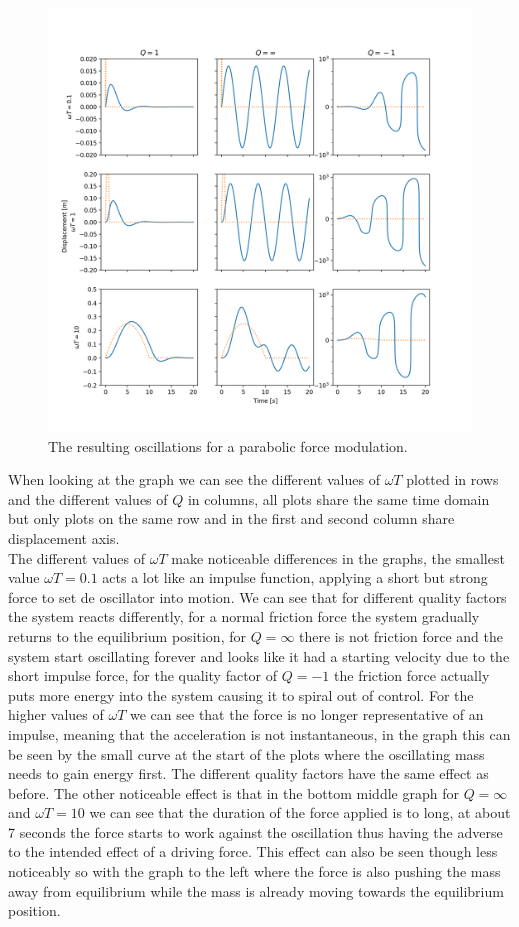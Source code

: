 \begin{figure}[h!]
    \centering
    \includegraphics[width=.7\linewidth,keepaspectratio]{figures/Q3_omega_q_plot.png}
    \caption{The resulting oscillations for a parabolic force modulation. }
    \label{fig:fig_Q3}
\end{figure}

When looking at the graph we can see the different values of $\omega T$ plotted in rows and the different values of $Q$ in columns, all plots share the same time domain but only plots on the same row and in the first and second column share displacement axis.\\
The different values of $\omega T$ make noticeable differences in the graphs, the smallest value $\omega T = 0.1$ acts a lot like an impulse function, applying a short but strong force to set de oscillator into motion. We can see that for different quality factors the system reacts differently, for a normal friction force the system gradually returns to the equilibrium position, for $Q = \infty$ there is not friction force and the system start oscillating forever and looks like it had a starting velocity due to the short impulse force, for the quality factor of $Q = -1$ the friction force actually puts more energy into the system causing it to spiral out of control.
For the higher values of $\omega T$ we can see that the force is no longer representative of an impulse, meaning that the acceleration is not instantaneous, in the graph this can be seen by the small curve at the start of the plots where the oscillating mass needs to gain energy first. The different quality factors have the same effect as before.
The other noticeable effect is that in the bottom middle graph for $Q=\infty$ and $\omega T = 10$ we can see that the duration of the force applied is to long, at about 7 seconds the force starts to work against the oscillation thus having the adverse to the intended effect of a driving force. This effect can also be seen though less noticeably so with the graph to the left where the force is also pushing the mass away from equilibrium while the mass is already moving towards the equilibrium position.\\